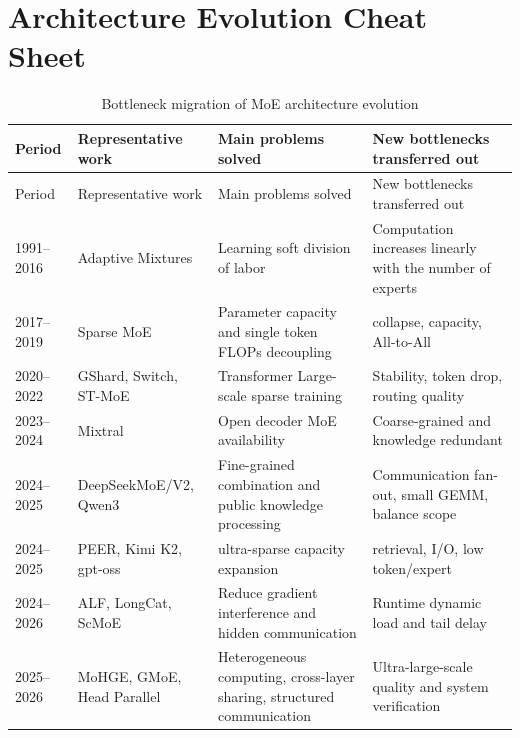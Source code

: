 \documentclass[10pt,a4paper,fontset=none]{ctexart}
\begin{document}
\appendix
\section{Architecture Evolution Cheat Sheet}

\begin{longtable}{@{}p{}p{}p{}p{}@{}}
\caption{Bottleneck migration of MoE architecture evolution}\label{tab:timeline}\\
\toprule
Period & Representative work & Main problems solved & New bottlenecks transferred out \\
\midrule
\endfirsthead
\toprule
Period & Representative work & Main problems solved & New bottlenecks transferred out \\
\midrule
\endhead
1991--2016 & Adaptive Mixtures & Learning soft division of labor & Computation increases linearly with the number of experts \\
2017--2019 & Sparse MoE & Parameter capacity and single token FLOPs decoupling & collapse, capacity, All-to-All \\
2020--2022 & GShard, Switch, ST-MoE & Transformer Large-scale sparse training & Stability, token drop, routing quality \\
2023--2024 & Mixtral & Open decoder MoE availability & Coarse-grained and knowledge redundant \\
2024--2025 & DeepSeekMoE/V2, Qwen3 & Fine-grained combination and public knowledge processing & Communication fan-out, small GEMM, balance scope \\
2024--2025 & PEER, Kimi K2, gpt-oss & ultra-sparse capacity expansion & retrieval, I/O, low token/expert \\
2024--2026 & ALF, LongCat, ScMoE & Reduce gradient interference and hidden communication & Runtime dynamic load and tail delay \\
2025--2026 & MoHGE, GMoE, Head Parallel & Heterogeneous computing, cross-layer sharing, structured communication & Ultra-large-scale quality and system verification \\
\bottomrule
\end{longtable}
\end{document}
